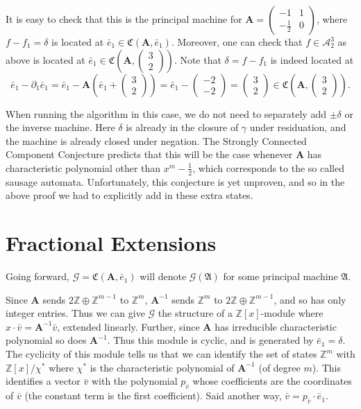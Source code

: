 \documentclass[final]{ws-ijac}
\newcommand{\A}{\mathcal{A}}
\newcommand{\G}{\mathcal{G}}
\renewcommand{\P}{\mathfrak{A}}
\newcommand{\Z}{\mathbb{Z}}
\newcommand{\2}{\textbf{2}}
\newcommand{\Am}{\textbf{A}}
\newcommand{\del}{\partial}
\newcommand{\vv}{\bar{v}}
\newcommand{\e}{\bar{e}}
\begin{document}
It is easy to check that this is the principal machine for
$\Am = \begin{pmatrix} -1 & 1 \\ -\frac{1}{2} & 0 \end{pmatrix}$,
where $f - f_1 = \delta$ is located at $\e_1 \in \mathfrak{C}(\Am, \e_1)$.
Moreover, one can check that $f \in \A^3_2$ as above is located at 
$\e_1 \in \mathfrak{C}\left ( \Am, \begin{pmatrix} 3 \\ 2 \end{pmatrix} \right )$.
Note that $\delta = f - f_1$ is indeed located at 
\[ 
  \e_1 - \del_1 \e_1 = 
  \e_1 - \Am \left ( \e_1 + \begin{pmatrix} 3 \\ 2 \end{pmatrix} \right ) = 
  \e_1 - \begin{pmatrix} -2 \\ -2 \end{pmatrix} =
  \begin{pmatrix} 3 \\ 2 \end{pmatrix} \in
  \mathfrak{C}\left ( \Am, \begin{pmatrix} 3 \\ 2 \end{pmatrix} \right ).
\]

When running the algorithm in this case, we do not need to separately add
$\pm \delta$ or the inverse machine. Here $\delta$ is already in the closure of
$\gamma$ under residuation, and the machine is already closed under negation. 
The Strongly Connected Component Conjecture 
predicts that this will be the case whenever $\Am$ has characteristic 
polynomial other than $x^m - \frac{1}{2}$, which corresponds to the so called 
sausage automata. Unfortunately, this conjecture is yet unproven,
and so in the above proof we had to explicitly add in these extra states.

\section{Fractional Extensions}
Going forward, $\G = \mathfrak{C}(\Am,\e_1)$ will denote $\G(\P)$ for some 
principal machine $\P$. 

Since $\Am$ sends $2\Z \oplus \Z^{m-1}$ to $\Z^m$, 
$\Am^{-1}$ sends $\Z^m$ to $2\Z \oplus \Z^{m-1}$, and so has 
only integer entries. Thus we can give $\G$ the structure of a 
$\Z[x]$-module where $x \cdot \vv = \Am^{-1}\vv$, extended linearly. Further, 
since $\Am$ has irreducible characteristic polynomial so does $\Am^{-1}$. Thus 
this module is cyclic, and is generated by $\e_1 = \delta$. The cyclicity of 
this module tells us that we can identify the set of states $\Z^m$ with 
$\Z[x] / \chi^*$ 
where $\chi^*$ is the characteristic polynomial of $\Am^{-1}$ (of degree $m$).
This identifies a vector $\vv$ with the polynomial $p_{\vv}$ whose 
coefficients are the coordinates of $\vv$ (the constant term is the first 
coefficient). Said another way, $\vv = p_{\vv} \cdot \e_1$.
\end{document}
